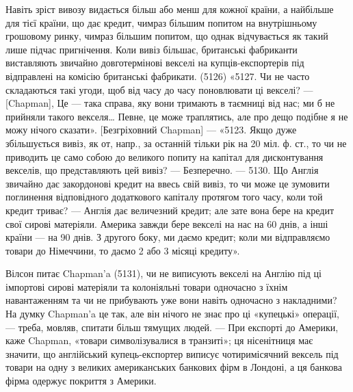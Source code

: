 \parcont{}  %
Навіть зріст вивозу видається більш або менш для кожної країни, а найбільше
для тієї країни, що дає кредит, чимраз більшим попитом на внутрішньому
грошовому ринку, чимраз більшим попитом, що однак відчувається як
такий лише підчас пригнічення. Коли вивіз більшає, британські фабриканти виставляють
звичайно довготермінові векселі на купців-експортерів під відправлені
на комісію британські фабрикати. (5126) «5127. Чи не часто складаються такі
угоди, щоб від часу до часу поновлювати ці векселі? — [Chapman], Це — така
справа, яку вони тримають в таємниці від нас; ми б не прийняли такого векселя\dots{}
Певне, це може траплятись, але про дещо подібне я не можу нічого
сказати». [Безгріховний Chapman] — «5123. Якщо дуже збільшується вивіз, як
от, напр., за останній тільки рік на 20 міл. ф. ст., то чи не приводить це само
собою до великого попиту на капітал для дисконтування векселів, що представляють
цей вивіз? — Безперечно. — 5130. Що Англія звичайно дає закордонові
кредит на ввесь свій вивіз, то чи може це зумовити поглинення відповідного
додаткового капіталу протягом того часу, коли той кредит триває? —
Англія дає величезний кредит; але зате вона бере на кредит свої сирові
матеріяли. Америка завжди бере векселі на нас на 60 днів, а інші країни — на
90 днів. З другого боку, ми даємо кредит; коли ми відправляємо товари до
Німеччини, то даємо 2 або 3 місяці кредиту».

Вілсон питає Chapman’a (5131), чи не виписують векселі на Англію під
ці імпортові сирові матеріяли та колоніяльні товари одночасно з їхнім навантаженням
та чи не прибувають уже вони навіть одночасно з накладними? На
думку Chapman’a це так, але він нічого не знає про ці «купецькі» операції, —
треба, мовляв, спитати більш тямущих людей. — При експорті до Америки, каже
Chapman, «товари символізувалися в транзиті»; ця нісенітниця має значити, що
англійський купець-експортер виписує чотиримісячний вексель під товари на
одну з великих американських банкових фірм в Лондоні, а ця банкова фірма
одержує покриття з Америки.

